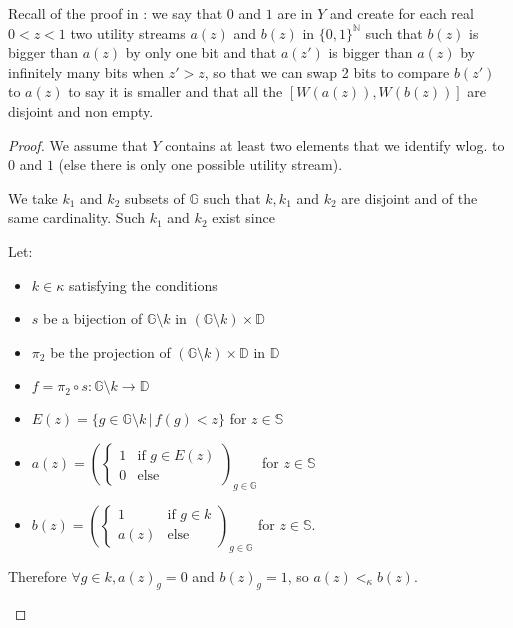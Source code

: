 \documentclass{article}
\newcommand{\G}{\mathbb{G}}
\newcommand{\D}{\mathbb{D}}
\begin{document}
Recall of the proof in \cite{basumitra03} : we say that $0$ and $1$ are in $Y$ and
create for each real $0<z<1$ two utility streams $a(z)$ and $b(z)$ in
$\{0,1\}^{\mathbb N}$ such that $b(z)$ is bigger than $a(z)$ by only one bit and
that $a(z')$ is bigger than $a(z)$ by infinitely many bits when $z'>z$, so that we
can swap 2 bits to compare $b(z')$ to $a(z)$ to say it is smaller and that all the
$[W(a(z)),W(b(z))]$ are disjoint and non empty.

\begin{proof}
  We assume that $Y$ contains at least two elements that we identify wlog. to $0$
  and $1$ (else there is only one possible utility stream).\par
  We take $k_1$ and $k_2$ subsets of $\G$ such that $k, k_1$ and $k_2$ are disjoint and
  of the same cardinality. Such $k_1$ and $k_2$ exist since 

  Let:
  \begin{itemize}
  \item $k\in\kappa$ satisfying the conditions
  \item $s$ be a bijection of $\G\setminus k$ in $(\G\setminus k)\times\D$
  \item $\pi_2$ be the projection of $(\G\setminus k)\times \D$
        in $\mathbb D$
  \item $f=\pi_2\circ s:\G\setminus k\to\D$
  \item $E(z)=\{g\in \G\setminus k\,|\, f(g)<z\}$ for $z\in\mathbb S$
  \item $\displaystyle a(z)=\left(\left\{\begin{array}{ll}1&\text{if }g\in
        E(z)\\0&\text{else}\end{array}\right.\right)_{g\in\G}$ for $z\in \mathbb S$
  \item $\displaystyle b(z)=\left(\left\{\begin{array}{ll}1&\text{if }g\in
        k\\a(z)&\text{else}\end{array}\right.\right)_{g\in\G}$ for $z\in \mathbb S$.
  \end{itemize}

  Therefore $\forall g\in k, a(z)_g=0$ and $b(z)_g=1$, so $a(z)<_\kappa b(z)$.

  \begin{center}
  \end{center}


\end{proof}
\end{document}
